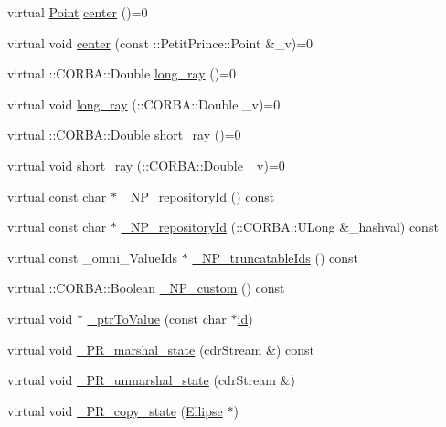 \begin{DoxyCompactItemize}
\item 
virtual \hyperlink{struct_point}{Point} \hyperlink{class_ellipse_a7c167034ea6380590201091da189a08b}{center} ()=0
\item 
virtual void \hyperlink{class_ellipse_a9002930f3e980351e775592942cac3fc}{center} (const \+::Petit\+Prince\+::\+Point \&\+\_\+v)=0
\item 
virtual \+::C\+O\+R\+B\+A\+::\+Double \hyperlink{class_ellipse_a2656a501e4ee8296f8ec71aa5b63f4db}{long\+\_\+ray} ()=0
\item 
virtual void \hyperlink{class_ellipse_ae089aa3f771974912d1c73d9db94cc70}{long\+\_\+ray} (\+::C\+O\+R\+B\+A\+::\+Double \+\_\+v)=0
\item 
virtual \+::C\+O\+R\+B\+A\+::\+Double \hyperlink{class_ellipse_a836989b508beb2da448363e5ed63aec2}{short\+\_\+ray} ()=0
\item 
virtual void \hyperlink{class_ellipse_a4d6bf30278c2839a5d38aa4351cf3a2f}{short\+\_\+ray} (\+::C\+O\+R\+B\+A\+::\+Double \+\_\+v)=0
\item 
virtual const char $\ast$ \hyperlink{class_ellipse_a0e56c51dadf0c21c5f3c82bd7ae3c34c}{\+\_\+\+N\+P\+\_\+repository\+Id} () const 
\item 
virtual const char $\ast$ \hyperlink{class_ellipse_a61c90841d732f4e69247545fc736c321}{\+\_\+\+N\+P\+\_\+repository\+Id} (\+::C\+O\+R\+B\+A\+::\+U\+Long \&\+\_\+hashval) const 
\item 
virtual const \+\_\+omni\+\_\+\+Value\+Ids $\ast$ \hyperlink{class_ellipse_ae5257f936afdfbbeb0ef3344231fc111}{\+\_\+\+N\+P\+\_\+truncatable\+Ids} () const 
\item 
virtual \+::C\+O\+R\+B\+A\+::\+Boolean \hyperlink{class_ellipse_a020acd78a7f680f73c99dd038170749c}{\+\_\+\+N\+P\+\_\+custom} () const 
\item 
virtual void $\ast$ \hyperlink{class_ellipse_a7a69ec5b0954f4c623c9f450afb71d6c}{\+\_\+ptr\+To\+Value} (const char $\ast$\hyperlink{class_draw_a1bf27c5a59da9002d55936c947dce2cc}{id})
\item 
virtual void \hyperlink{class_ellipse_a63076fc769000247bd13c910dbf54c9e}{\+\_\+\+P\+R\+\_\+marshal\+\_\+state} (cdr\+Stream \&) const 
\item 
virtual void \hyperlink{class_ellipse_aa4dea62b56229863d757ae8861c225da}{\+\_\+\+P\+R\+\_\+unmarshal\+\_\+state} (cdr\+Stream \&)
\item 
virtual void \hyperlink{class_ellipse_a9959b5cef873ad4debf7ce4841172522}{\+\_\+\+P\+R\+\_\+copy\+\_\+state} (\hyperlink{class_ellipse}{Ellipse} $\ast$)
\end{DoxyCompactItemize}
